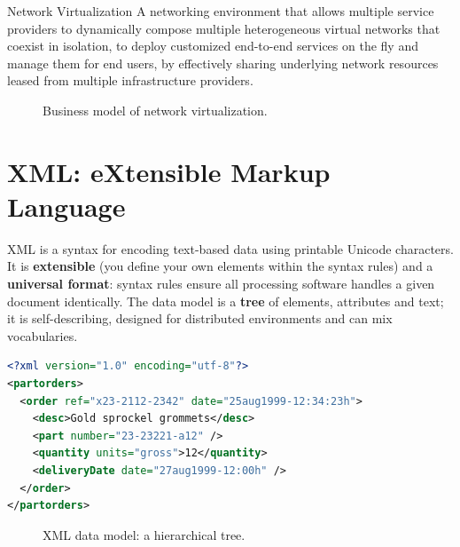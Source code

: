 \documentclass[11pt,a4paper,openany]{report}
\begin{document}
\begin{defbox}{Network Virtualization}
A networking environment that allows multiple service providers to dynamically compose multiple heterogeneous
virtual networks that coexist in isolation, to deploy customized end-to-end services on the fly and manage them
for end users, by effectively sharing underlying network resources leased from multiple infrastructure providers.
\end{defbox}

\begin{figure}[H]
\centering
{}
\caption{Business model of network virtualization.}
\end{figure}

\section{XML: eXtensible Markup Language}
XML is a syntax for encoding text-based data using printable Unicode characters. It is \textbf{extensible} (you define
your own elements within the syntax rules) and a \textbf{universal format}: syntax rules ensure all processing
software handles a given document identically. The data model is a \textbf{tree} of elements, attributes and text; it is
self-describing, designed for distributed environments and can mix vocabularies.

\begin{lstlisting}[language=XML]
<?xml version="1.0" encoding="utf-8"?>
<partorders>
  <order ref="x23-2112-2342" date="25aug1999-12:34:23h">
    <desc>Gold sprockel grommets</desc>
    <part number="23-23221-a12" />
    <quantity units="gross">12</quantity>
    <deliveryDate date="27aug1999-12:00h" />
  </order>
</partorders>
\end{lstlisting}

\begin{figure}[H]
\centering
{}
\caption{XML data model: a hierarchical tree.}
\end{figure}
\end{document}
